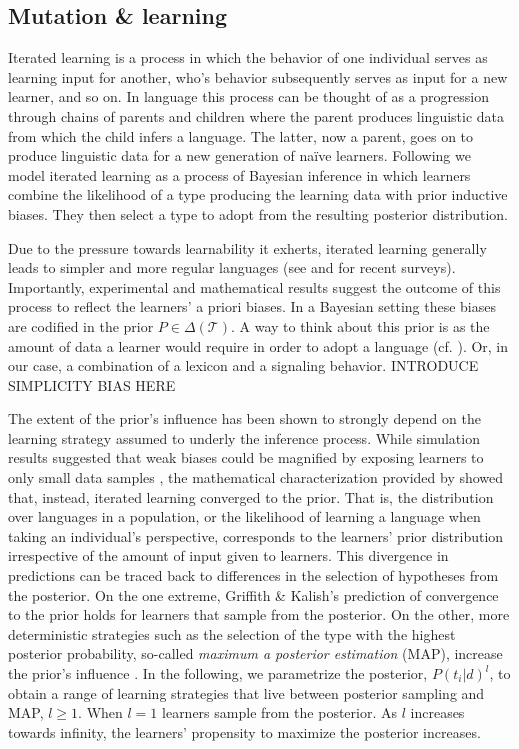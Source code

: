 \documentclass[a4paper]{article}
\newcommand{\hl}[1]{\textcolor[rgb]{.8,.33,.0}{#1}}%
\begin{document}
\subsection{Mutation \& learning}\label{sec:mutation}
Iterated learning is a process in which the behavior of one individual serves as learning input for another, who's behavior subsequently serves as input for a new learner, and so on. In language this process can be thought of as a progression through chains of parents and children where the parent produces linguistic data from which the child infers a language. The latter, now a parent, goes on to produce linguistic data for a new generation of na\"ive learners. Following \citet{griffiths+kalish:2007} we model iterated learning as a process of Bayesian inference in which learners combine the likelihood of a type producing the learning data with prior inductive biases. They then select a type to adopt from the resulting posterior distribution.

Due to the pressure towards learnability it exherts, iterated learning generally leads to simpler and more regular languages (see \citealt{kirby+etal:2014} and \citealt{tamariz+kirby:2016} for recent surveys). Importantly, experimental and mathematical results suggest the outcome of this process to reflect the learners' a priori biases. In a Bayesian setting these biases are codified in the prior $P \in \Delta(\mathcal{T})$. A way to think about this prior is as the amount of data a learner would require in order to adopt a language (cf. \citealt[450]{griffiths+kalish:2007}). Or, in our case, a combination of a lexicon and a signaling behavior. \hl{INTRODUCE SIMPLICITY BIAS HERE}

The extent of the prior's influence has been shown to strongly depend on the learning strategy assumed to underly the inference process. While simulation results suggested that weak biases could be magnified by exposing learners to only small data samples \citep{brighton:2002}, the mathematical characterization provided by \citet{griffiths+kalish:2007} showed that, instead, iterated learning converged to the prior. That is, the distribution over languages in a population, or the likelihood of learning a language when taking an individual's perspective, corresponds to the learners' prior distribution irrespective of the amount of input given to learners. This divergence in predictions can be traced back to differences in the selection of hypotheses from the posterior. On the one extreme, Griffith \& Kalish's prediction of convergence to the prior holds for learners that sample from the posterior. On the other, more deterministic strategies such as the selection of the type with the highest posterior probability, so-called {\it maximum a posterior estimation} (MAP), increase the prior's influence \citep{griffiths+kalish:2007,kirby+etal:2007}. In the following, we parametrize the posterior, $P(t_i|d)^l$, to obtain a range of learning strategies that live between posterior sampling and MAP, $l \geq 1$. When $l = 1$ learners sample from the posterior. As $l$ increases towards infinity, the learners' propensity to maximize the posterior increases. 
\end{document}
